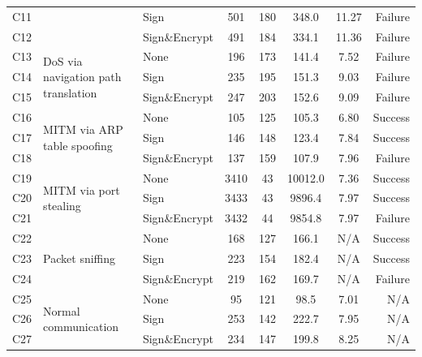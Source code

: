 \documentclass[pdflatex,sn-mathphys-num,iicol]{sn-jnl}%
\begin{document}
\begin{table}[ht]
\begin{tabular*}{\textwidth}{@{\extracolsep\fill}l l l c c c c r}
        C11 & & Sign & 501 & 180 & 348.0 & 11.27 & Failure \\
        C12 & & Sign\&Encrypt & 491 & 184 & 334.1 & 11.36 & Failure \\
        \midrule
        C13 & \multirow{3}{*}{\parbox{2.5cm}{DoS via navigation path translation}} & None & 196 & 173 & 141.4 & 7.52 & Failure \\
        C14 & & Sign & 235 & 195 & 151.3 & 9.03 & Failure \\
        C15 & & Sign\&Encrypt & 247 & 203 & 152.6 & 9.09 & Failure \\
        \midrule
        C16 & \multirow{3}{*}{\parbox{2.5cm}{MITM via ARP table spoofing}} & None & 105 & 125 & 105.3 & 6.80 & Success \\
        C17 & & Sign & 146 & 148 & 123.4 & 7.84 & Success \\
        C18 & & Sign\&Encrypt & 137 & 159 & 107.9 & 7.96 & Failure \\
        \midrule
        C19 & \multirow{3}{*}{\parbox{2.5cm}{MITM via port stealing}} & None & 3410 & 43 & 10012.0 & 7.36 & Success \\
        C20 & & Sign & 3433 & 43 & 9896.4 & 7.97 & Success \\
        C21 & & Sign\&Encrypt & 3432 & 44 & 9854.8 & 7.97 & Failure \\
        \midrule
        C22 & \multirow{3}{*}{\parbox{2.5cm}{Packet sniffing}} & None & 168 & 127 & 166.1 & N/A & Success \\
        C23 & & Sign & 223 & 154 & 182.4 & N/A & Success \\
        C24 & & Sign\&Encrypt & 219 & 162 & 169.7 & N/A & Failure \\
        \midrule
        C25 & \multirow{3}{*}{\parbox{2.5cm}{Normal communication}} & None & 95 & 121 & 98.5 & 7.01 & N/A \\
        C26 & & Sign & 253 & 142 & 222.7 & 7.95 & N/A \\
        C27 & & Sign\&Encrypt & 234 & 147 & 199.8 & 8.25 & N/A \\
        \bottomrule
    \end{tabular*}
\end{table}
\end{document}
